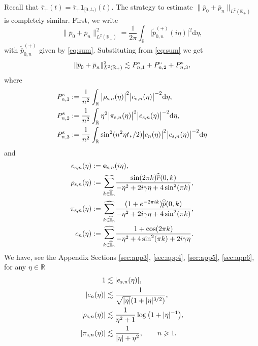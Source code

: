\documentclass[EJP]{ejpecp} %
\newcommand\R{{\mathbb R}}
\newcommand\T{{\mathbb I}}
\newcommand \ga{\gamma}
\renewcommand{\ge}{\geqslant}
\newcommand{\dd  }{\mathrm{d}}
\renewcommand{\hat}{\widehat}
\renewcommand{\tilde}{\widetilde}
\renewcommand{\bar}{\overline}
\numberwithin{equation}{section}
\begin{document}
Recall that $\bar\tau_+(t)=\bar\tau_+ \mathbf{1}_{[0,t_*)}(t)$. The strategy to estimate $\|\bar p_0+\bar p_n\|_{L^2(\R_+)}$ is completely similar. First, we write
\begin{equation}
\label{plancherel2}
 \|\bar p_0+\bar p_n\|_{L^2(\R_+)}^2=\frac{1}{2\pi}\int_{\R}\big|\tilde{\bar
  p}^{(+)}_{0,n}(i\eta)\big|^2 \dd\eta,
\end{equation}
with $\tilde{\bar
  p}^{(+)}_{0,n} $ given by \eqref{eq:sum}.
Substituting from \eqref{eq:sum} we get
\begin{align}
  \label{061812-19}
\|\bar p_0+\bar p_n\|_{L^2(\R_+)}^2\lesssim P^{\rm s}_{n,1}+P^{\rm s}_{n,2}+P^{\rm s}_{n,3},
 \end{align}
where
\begin{align}
  \label{061812-19b}
&P^{\rm s}_{n,1}:
=\frac{1}{n^2}\int_{\R}\big|\rho_{{\rm s},n}(\eta) \big|^2
  \big|e_{{\rm s},n}(\eta)\big|^{-2}\dd\eta,
 \\
 & \label{061812-19c}
P^{\rm s}_{n,2}:=\frac{1}{n^2}\int_{\R}\eta^2\big|\pi_{{\rm s},n}(\eta) \big|^2
  \big|e_{{\rm s},n}(\eta)\big|^{-2}\dd\eta
 ,\\
 & \label{061812-19a}
P^{\rm s}_{n,3}:
=\frac{1}{n^2}\int_{\R}\sin^2(n^2\eta
  t_*/2)\big|c_n(\eta) \big|^2
  \big|e_{{\rm s},n}(\eta)\big|^{-2}\dd\eta
 \end{align} 
and 
\begin{align}
e_{{\rm s},n}(\eta)&:=\mathbf{e}_{{\rm s},n}(i\eta),\\
\label{062712-19a}
\rho_{{\rm s},n}(\eta) &:=\underset{{k\in \widehat{\T}_n}}{{\hat\sum}}\frac{\sin(2\pi k)\widehat{\bar
    r}(0,k)}{-\eta^2+2i\ga\eta+4\sin^2(\pi k)},\\
\label{062712-19d} \pi_{{\rm s},n}(\eta) &:=\underset{{k\in \widehat{\T}_n}}{{\hat\sum}}\frac{(1+e^{-2\pi
  i k}) \widehat{\bar p}(0,k)}{-\eta^2+2i\ga\eta+4\sin^2(\pi k)},\\
\label{c-eta}
c_n(\eta)&:=\underset{{k\in \widehat{\T}_n}}{{\hat\sum}}\frac{1+\cos(2\pi k)}{-\eta^2+4\sin^2(\pi k)+2i\ga\eta }.
\end{align}
We have, see the Appendix Sections \ref{sec:app3}, \ref{sec:app4}, \ref{sec:app5}, \ref{sec:app6},  for any $\eta\in\R$
\begin{align}
\label{022012-19}
1&\lesssim |e_{{\rm s},n}(\eta)|,\\
\label{052312-19x}
|c_n(\eta)|&\lesssim \frac{1}{\sqrt{|\eta|}(1+|\eta|^{3/2})},\\
\label{042712-19c}
 |\rho_{{\rm s},n}(\eta)|&\lesssim
  \frac{1}{\eta^2+1} \log\big(1+|\eta|^{-1}\big),\\
\label{092712-19}
 |\pi_{{\rm s},n}(\eta)|&\lesssim
  \frac{1}{|\eta|+\eta^2},\qquad n\ge 1.
\end{align}
\end{document}
